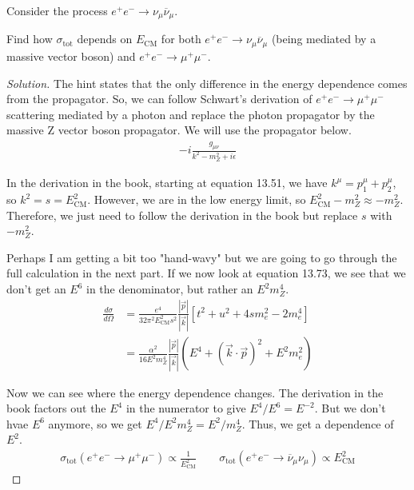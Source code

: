 \documentclass[12pt]{article}
\newenvironment{question}[2][Question]{\begin{trivlist}
\item[\hskip \labelsep {\bfseries #1}\hskip \labelsep {\bfseries #2.}]}{\end{trivlist}}
\newenvironment{questionpart}[2][Part]{\begin{trivlist}
\item[\hskip \labelsep \hskip \labelsep {\bfseries (#2)}]}{\end{trivlist}}
\newenvironment{solution}{\begin{proof}[Solution]}{\end{proof}}
\begin{document}
\newpage

\begin{question}{13.6}
Consider the process $e^+e^-\rightarrow \nu_\mu \overline{\nu}_\mu$.
\end{question}

\begin{questionpart}{a}
Find how $\sigma_\text{tot}$ depends on $E_\text{CM}$ for both $e^+e^-\rightarrow\nu_\mu\overline{\nu}_\mu$ (being mediated by a massive vector  boson) and $e^+e^-\rightarrow\mu^+\mu^-$.
\end{questionpart}

\begin{solution}

The hint states that the only difference in the energy dependence comes from the propagator. So, we can follow Schwart's derivation of $e^+e^-\rightarrow\mu^+\mu^-$ scattering mediated by a photon and replace the photon propagator by the massive Z vector boson propagator. We will use the propagator below.
\begin{align*}
    -i\frac{g_{\mu\nu}}{k^2-m_Z^2+i\epsilon}
\end{align*}

In the derivation in the book, starting at equation 13.51, we have $k^\mu=p_1^\mu+p_2^\mu$, so $k^2=s=E_\text{CM}^2$. However, we are in the low energy limit, so $E_\text{CM}^2-m_Z^2\approx-m_Z^2$. Therefore, we just need to follow the derivation in the book but replace $s$ with $-m_Z^2$.

Perhaps I am getting a bit too "hand-wavy" but we are going to go through the full calculation in the next part. If we now look at equation 13.73, we see that we don't get an $E^6$ in the denominator, but rather an $E^2m_Z^4$.
\begin{align*}
    \frac{d\sigma}{d\Omega}&=\frac{e^4}{32\pi^2 E_\text{CM}^2 s^2}\frac{|\vec{p}|}{|\vec{k}|}\left[t^2+u^2+4sm_e^2-2m_e^4\right] \\
    &= \frac{\alpha^2}{16E^2m_Z^4}\frac{|\vec{p}|}{|\vec{k}|}(E^4+(\vec{k}\cdot\vec{p})^2+E^2m_e^2)
\end{align*}

Now we can see where the energy dependence changes. The derivation in the book factors out the $E^4$ in the numerator to give $E^4/E^6=E^{-2}$. But we don't hvae $E^6$ anymore, so we get $E^4/E^2m_Z^4=E^2/m_Z^4$. Thus, we get a dependence of $E^2$.
\begin{align*}
    \boxed{\sigma_\text{tot}(e^+e^-\rightarrow\mu^+\mu^-)\propto\frac{1}{E_\text{CM}^2}\qquad \sigma_\text{tot}(e^+e^-\rightarrow\overline{\nu}_\mu\nu_\mu)\propto E_\text{CM}^2}
\end{align*}
\end{solution}
\end{document}
